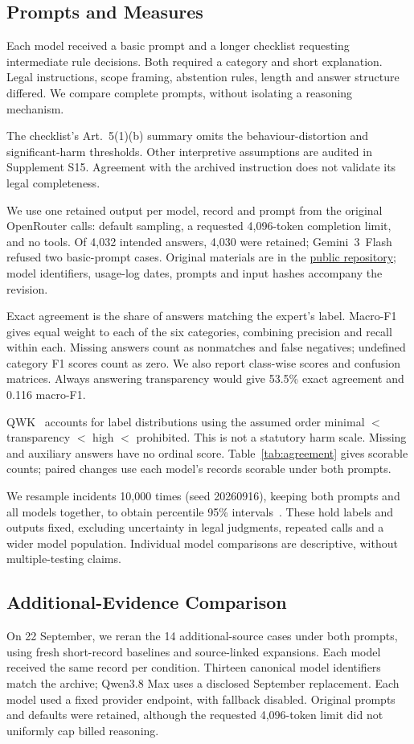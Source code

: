 \documentclass[sigconf,natbib=false,language=english]{acmart}
\begin{document}
\subsection{Prompts and Measures}
Each model received a basic prompt and a longer checklist requesting intermediate rule decisions. Both required a category and short explanation. Legal instructions, scope framing, abstention rules, length and answer structure differed. We compare complete prompts, without isolating a reasoning mechanism.

The checklist's Art.~5(1)(b) summary omits the behaviour-distortion and significant-harm thresholds. Other interpretive assumptions are audited in Supplement S15. Agreement with the archived instruction does not validate its legal completeness.

We use one retained output per model, record and prompt from the original OpenRouter calls: default sampling, a requested 4,096-token completion limit, and no tools. Of 4,032 intended answers, 4,030 were retained; Gemini~3~Flash refused two basic-prompt cases. Original materials are in the \href{https://github.com/stefankofilovski-lang/category-not-severity}{public repository}; model identifiers, usage-log dates, prompts and input hashes accompany the revision.

Exact agreement is the share of answers matching the expert's label. Macro-F1 gives equal weight to each of the six categories, combining precision and recall within each. Missing answers count as nonmatches and false negatives; undefined category F1 scores count as zero. We also report class-wise scores and confusion matrices. Always answering transparency would give 53.5\% exact agreement and 0.116 macro-F1.

QWK~\cite{cohen1968} accounts for label distributions using the assumed order minimal $<$ transparency $<$ high $<$ prohibited. This is not a statutory harm scale. Missing and auxiliary answers have no ordinal score. Table~\ref{tab:agreement} gives scorable counts; paired changes use each model's records scorable under both prompts.

We resample incidents 10,000 times (seed 20260916), keeping both prompts and all models together, to obtain percentile 95\% intervals~\cite{dror2018}. These hold labels and outputs fixed, excluding uncertainty in legal judgments, repeated calls and a wider model population. Individual model comparisons are descriptive, without multiple-testing claims.

\subsection{Additional-Evidence Comparison}
On 22 September, we reran the 14 additional-source cases under both prompts, using fresh short-record baselines and source-linked expansions. Each model received the same record per condition. Thirteen canonical model identifiers match the archive; Qwen3.8 Max uses a disclosed September replacement. Each model used a fixed provider endpoint, with fallback disabled. Original prompts and defaults were retained, although the requested 4,096-token limit did not uniformly cap billed reasoning.
\end{document}
